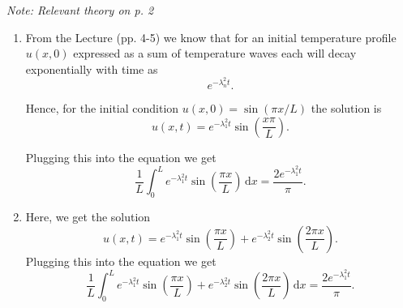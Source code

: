 \begin{derivation}
      \textit{Note: Relevant theory on p. 2}
  \begin{enumerate}[label=\alph*)]
  \item   From the Lecture (pp. 4-5) we know that for an initial temperature profile $u(x,0)$ expressed as a sum of temperature waves each will decay exponentially with time as
    \begin{equation*}
      e^{-\lambda_n^2t}
    .\end{equation*}

    Hence, for the initial condition $u(x,0) = \sin (\pi x / L)$ the solution is
    \begin{equation*}
      u(x,t) = e^{-\lambda_1^2 t} \sin \left( \frac{x \pi}{L}\right)
    .\end{equation*}

    Plugging this into the equation we get
    \begin{equation*}
      \frac{1}{L} \int_{0}^{L} e^{-\lambda_1^2 t} \sin \left( \frac{\pi x}{L} \right) \, \mathrm{d}x  = \frac{2 e^{-\lambda _1^2 t}}{\pi }
    .\end{equation*}
  \item Here, we get the solution
    \begin{equation*}
      u(x,t) = e^{-\lambda_1^2 t} \sin \left( \frac{\pi x}{L} \right) + e^{-\lambda_2^2 t} \sin \left( \frac{2\pi x}{L} \right)
    .\end{equation*}
    Plugging this into the equation we get
    \begin{equation*}
      \frac{1}{L} \int_{0}^{L} e^{-\lambda_1^2 t} \sin \left( \frac{\pi x}{L} \right) + e^{-\lambda_2^2 t} \sin \left( \frac{2 \pi x}{L} \right) \, \mathrm{d}x  = \frac{2 e^{-\lambda _1^2t}}{\pi }
    .\end{equation*}
  \end{enumerate}
\end{derivation}

